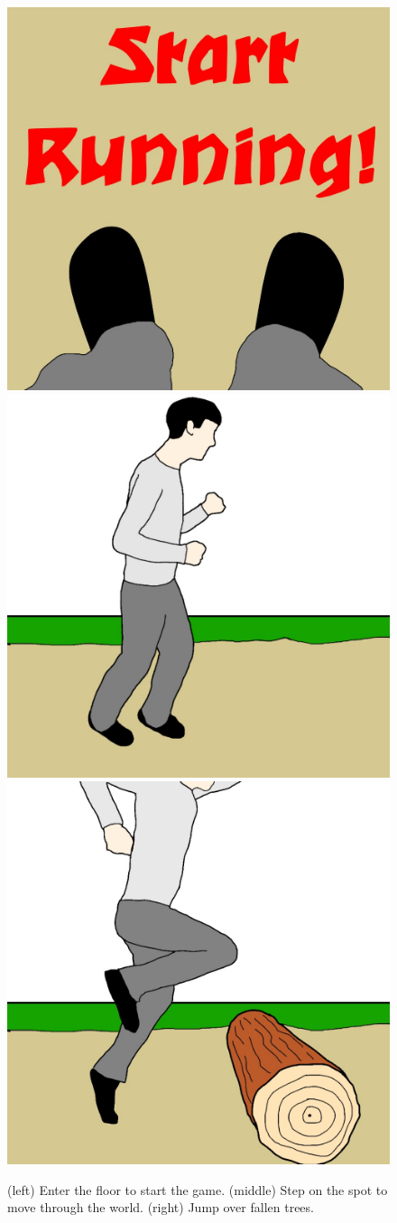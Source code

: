 \documentclass{sigchi}
\begin{document}
  \begin{figure}[!htb]
    \centering
    \includegraphics[width=0.32\linewidth]{Image_4.jpg}
    \includegraphics[width=0.32\linewidth]{Image_5.jpg}
    \includegraphics[width=0.32\linewidth]{Image_1.jpg}
    \caption{(left) Enter the floor to start the game. (middle) Step on the spot to move through the world. (right) Jump over fallen trees.}
  \end{figure}
\end{document}
